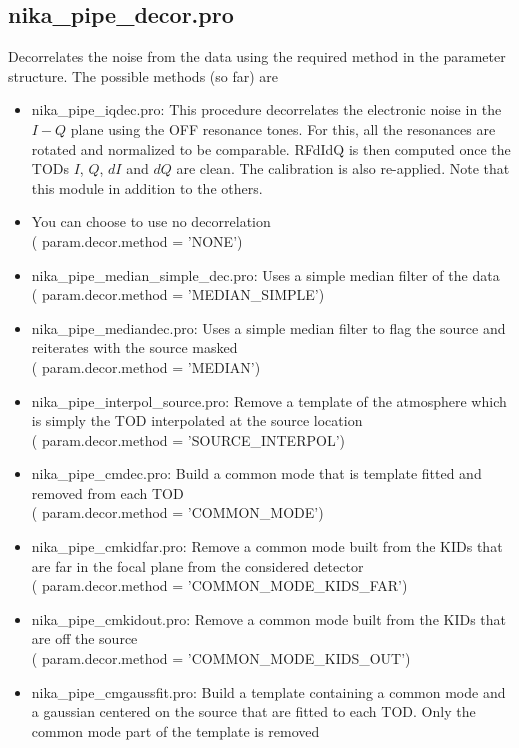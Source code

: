 \documentclass[a4paper]{article}
\begin{document}
\subsection{{\color{blue} nika\_pipe\_decor.pro}}
\label{sec:decor_methods}
Decorrelates the noise from the data using the required method in the parameter structure. The possible methods (so far) are
\begin{itemize}
\item {\color{blue} nika\_pipe\_iqdec.pro}: This procedure decorrelates the electronic noise in the $I-Q$ plane using the OFF resonance tones. For this, all the resonances are rotated and normalized to be comparable. RFdIdQ is then computed once the TODs $I$, $Q$, $dI$ and $dQ$ are clean. The calibration is also re-applied. Note that this module in addition to the others.
\item You can choose to use no decorrelation \\
({\color{blue} param.decor.method = 'NONE'})
\item {\color{blue} nika\_pipe\_median\_simple\_dec.pro}: Uses a simple median filter of the data \\
({\color{blue} param.decor.method = 'MEDIAN\_SIMPLE'})
\item {\color{blue} nika\_pipe\_mediandec.pro}: Uses a simple median filter to flag the source and reiterates with the source masked \\
({\color{blue} param.decor.method = 'MEDIAN'})
\item {\color{blue} nika\_pipe\_interpol\_source.pro}: Remove a template of the atmosphere which is simply the TOD interpolated at the source location \\
({\color{blue} param.decor.method = 'SOURCE\_INTERPOL'})
\item {\color{blue} nika\_pipe\_cmdec.pro}: Build a common mode that is template fitted and removed from each TOD \\
({\color{blue} param.decor.method = 'COMMON\_MODE'})
\item {\color{blue} nika\_pipe\_cmkidfar.pro}: Remove a common mode built from the KIDs that are far in the focal plane from the considered detector\\
({\color{blue} param.decor.method = 'COMMON\_MODE\_KIDS\_FAR'})
\item {\color{blue} nika\_pipe\_cmkidout.pro}: Remove a common mode built from the KIDs that are off the source\\
({\color{blue} param.decor.method = 'COMMON\_MODE\_KIDS\_OUT'})
\item {\color{blue} nika\_pipe\_cmgaussfit.pro}: Build a template containing a common mode and a gaussian centered on the source that are fitted to each TOD. Only the common mode part of the template is removed\\

\end{itemize}
\end{document}
